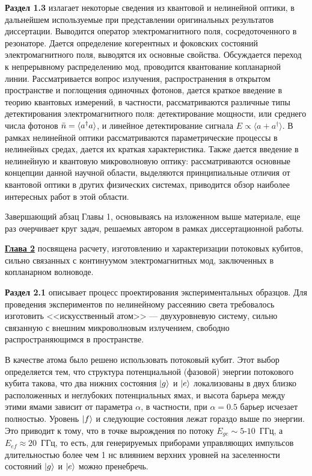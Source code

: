 \textbf{Раздел 1.3} излагает некоторые сведения из квантовой и нелинейной оптики, в дальнейшем используемые при представлении оригинальных результатов диссертации. Выводится оператор электромагнитного поля, сосредоточенного в резонаторе. Дается определение когерентных и фоковских состояний электромагнитного поля, выводятся их основные свойства. Обсуждается переход к непрерывному распределению мод, проводится квантование копланарной линии. Рассматривается вопрос излучения, распространения в открытом пространстве и поглощения одиночных фотонов, дается краткое введение в теорию квантовых измерений, в частности, рассматриваются различные типы детектирования электромагнитного поля: детектирование мощности, или среднего числа фотонов $\bar{n}= \braket{a^\dag a}$, и линейное детектирование сигнала $E\propto \langle a+a^\dag\rangle$. В рамках нелинейной оптики рассматриваются параметрические процессы в нелинейных средах, дается их краткая характеристика. Также дается введение в нелинейную и квантовую микроволновую оптику: рассматриваются основные концепции данной научной области, выделяются принципиальные отличия от квантовой оптики в других физических системах, приводится обзор наиболее интересных работ в этой области.

Завершающий абзац Главы 1, основываясь на изложенном выше материале, еще раз очерчивает круг задач, решаемых автором в рамках диссертационной работы.

\underline{\textbf{Глава 2}} посвящена расчету, изготовлению и характеризации потоковых кубитов, сильно связанных с континуумом электромагнитных мод, заключенных в копланарном волноводе. 

\textbf{Раздел 2.1} описывает процесс проектирования экспериментальных образцов. Для проведения экспериментов по нелинейному рассеянию света требовалось изготовить <<искусственный атом>> --- двухуровневую систему, сильно связанную с внешним микроволновым излучением, свободно распространяющимся в пространстве. 

В качестве атома было решено использовать потоковый кубит. Этот выбор определяется тем, что структура потенциальной (фазовой) энергии потокового кубита такова, что два нижних состояния $\ket{g}$ и $\ket{e}$ локализованы в двух близко расположенных и неглубоких потенциальных ямах, и высота барьера между этими ямами зависит от параметра $\alpha$, в частности, при $\alpha=0.5$ барьер исчезает полностью. Уровень $\ket{f}$ и следующие состояния лежат гораздо выше по энергии.  Это приводит к тому, что в точке вырождения по потоку $E_{ge} \sim 5$-$10$~ГГц, а $E_{ef} \approx 20$~ГГц, то есть, для генерируемых приборами управляющих импульсов длительностью более чем 1 нс влиянием верхних уровней на заселенности состояний $\ket{g}$ и $\ket{e}$ можно пренебречь. 

